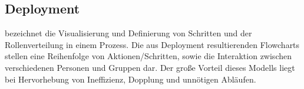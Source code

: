 \subsection{Deployment}
bezeichnet die Visualisierung und Definierung von Schritten und der Rollenverteilung in einem Prozess. Die aus Deployment resultierenden Flowcharts stellen eine Reihenfolge von Aktionen/Schritten, sowie die Interaktion zwischen verschiedenen Personen und Gruppen dar. Der große Vorteil dieses Modells liegt bei Hervorhebung von Ineffizienz, Dopplung und unnötigen Abläufen. \cite{deploywiki}
